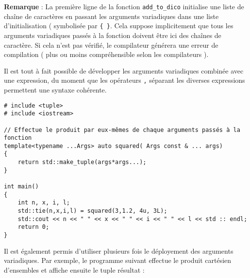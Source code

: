 \documentclass[a4]{article}
\begin{document}
\textbf{Remarque} : La première ligne de la fonction \verb$add_to_dico$ initialise
une liste de chaîne de caractères en passant les arguments variadiques dans une liste
d'initialisation ( symbolisée par \verb${ }$. Cela suppose implicitement que tous les arguments variadiques passés à la fonction doivent être ici des chaînes de caractère.
Si cela n'est pas vérifié, le compilateur générera une erreur de compilation ( plus ou moins compréhensible selon les compilateurs ).

Il est tout à fait possible de développer les arguments variadiques combinée avec une expression, du moment que les opérateurs \verb$,$ séparant les diverses expressions permettent une syntaxe cohérente.

\begin{lstlisting}
# include <tuple>
# include <iostream>

// Effectue le produit par eux-mêmes de chaque arguments passés à la fonction
template<typename ...Args> auto squared( Args const & ... args)
{
    return std::make_tuple(args*args...);
}

int main()
{
    int n, x, i, l;
    std::tie(n,x,i,l) = squared(3,1.2, 4u, 3L);
    std::cout << n << " " << x << " " << i << " " << l << std :: endl;
    return 0;
}
\end{lstlisting}

Il est également permis d'utiliser plusieurs fois le déployement des arguments variadiques. Par exemple, le programme suivant
effectue le produit cartésien d'ensembles et affiche ensuite le tuple résultat :
\end{document}
